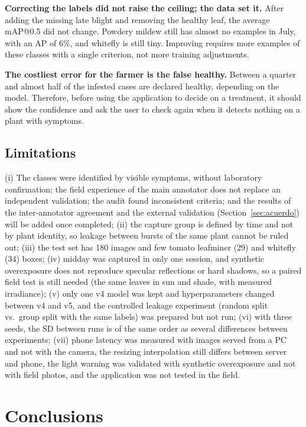 \documentclass[sensors,article,submit,pdftex,moreauthors]{Definitions/mdpi}
\begin{document}
\textbf{Correcting the labels did not raise the ceiling; the data set it.} After adding the missing late blight and removing the healthy leaf, the average mAP@0.5 did not change. Powdery mildew still has almost no examples in July, with an AP of 6\%, and whitefly is still tiny. Improving requires more examples of these classes with a single criterion, not more training adjustments.

\textbf{The costliest error for the farmer is the false healthy.} Between a quarter and almost half of the infested cases are declared healthy, depending on the model. Therefore, before using the application to decide on a treatment, it should show the confidence and ask the user to check again when it detects nothing on a plant with symptoms.

\subsection{Limitations}\label{sec:limitaciones}

(i) The classes were identified by visible symptoms, without laboratory confirmation; the field experience of the main annotator does not replace an independent validation; the audit found inconsistent criteria; and the results of the inter-annotator agreement and the external validation (Section~\ref{sec:acuerdo}) will be added once completed; (ii) the capture group is defined by time and not by plant identity, so leakage between bursts of the same plant cannot be ruled out; (iii) the test set has 180 images and few tomato leafminer (29) and whitefly (34) boxes; (iv) midday was captured in only one session, and synthetic overexposure does not reproduce specular reflections or hard shadows, so a paired field test is still needed (the same leaves in sun and shade, with measured irradiance); (v) only one v4 model was kept and hyperparameters changed between v4 and v5, and the controlled leakage experiment (random split vs.\ group split with the same labels) was prepared but not run; (vi) with three seeds, the SD between runs is of the same order as several differences between experiments; (vii) phone latency was measured with images served from a PC and not with the camera, the resizing interpolation still differs between server and phone, the light warning was validated with synthetic overexposure and not with field photos, and the application was not tested in the field.

\section{Conclusions}
\end{document}

